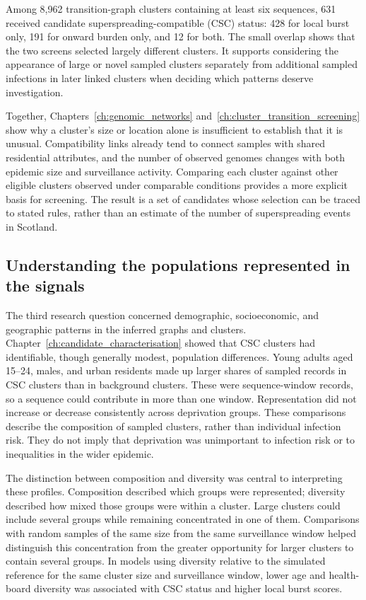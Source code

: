 Among 8,962 transition-graph clusters containing at least six sequences, 631 received candidate superspreading-compatible (CSC) status: 428 for local burst only, 191 for onward burden only, and 12 for both. The small overlap shows that the two screens selected largely different clusters. It supports considering the appearance of large or novel sampled clusters separately from additional sampled infections in later linked clusters when deciding which patterns deserve investigation.

Together, Chapters~\ref{ch:genomic_networks} and~\ref{ch:cluster_transition_screening} show why a cluster's size or location alone is insufficient to establish that it is unusual. Compatibility links already tend to connect samples with shared residential attributes, and the number of observed genomes changes with both epidemic size and surveillance activity. Comparing each cluster against other eligible clusters observed under comparable conditions provides a more explicit basis for screening. The result is a set of candidates whose selection can be traced to stated rules, rather than an estimate of the number of superspreading events in Scotland.

\subsection{Understanding the populations represented in the signals}\label{sec:ch7_synthesis_characterisation}

The third research question concerned demographic, socioeconomic, and geographic patterns in the inferred graphs and clusters. Chapter~\ref{ch:candidate_characterisation} showed that CSC clusters had identifiable, though generally modest, population differences. Young adults aged 15--24, males, and urban residents made up larger shares of sampled records in CSC clusters than in background clusters. These were sequence-window records, so a sequence could contribute in more than one window. Representation did not increase or decrease consistently across deprivation groups. These comparisons describe the composition of sampled clusters, rather than individual infection risk. They do not imply that deprivation was unimportant to infection risk or to inequalities in the wider epidemic.

The distinction between composition and diversity was central to interpreting these profiles. Composition described which groups were represented; diversity described how mixed those groups were within a cluster. Large clusters could include several groups while remaining concentrated in one of them. Comparisons with random samples of the same size from the same surveillance window helped distinguish this concentration from the greater opportunity for larger clusters to contain several groups. In models using diversity relative to the simulated reference for the same cluster size and surveillance window, lower age and health-board diversity was associated with CSC status and higher local burst scores.

